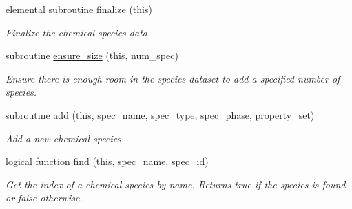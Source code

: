 \begin{DoxyCompactItemize}
elemental subroutine \mbox{\hyperlink{namespacepmc__chem__spec__data_ac14765515e7b7e1ed204998684e5412e}{finalize}} (this)
\begin{DoxyCompactList}\small\item\em Finalize the chemical species data. \end{DoxyCompactList}\item 
subroutine \mbox{\hyperlink{namespacepmc__chem__spec__data_aee2a5f3c45a7fd6b4e51a7286022379d}{ensure\+\_\+size}} (this, num\+\_\+spec)
\begin{DoxyCompactList}\small\item\em Ensure there is enough room in the species dataset to add a specified number of species. \end{DoxyCompactList}\item 
subroutine \mbox{\hyperlink{namespacepmc__chem__spec__data_a09de56593d91886a82053ee6052bce52}{add}} (this, spec\+\_\+name, spec\+\_\+type, spec\+\_\+phase, property\+\_\+set)
\begin{DoxyCompactList}\small\item\em Add a new chemical species. \end{DoxyCompactList}\item 
logical function \mbox{\hyperlink{namespacepmc__chem__spec__data_a94efcf0206ad02470c47712887ab0eaa}{find}} (this, spec\+\_\+name, spec\+\_\+id)
\begin{DoxyCompactList}\small\item\em Get the index of a chemical species by name. Returns true if the species is found or false otherwise. \end{DoxyCompactList}\end{DoxyCompactItemize}
